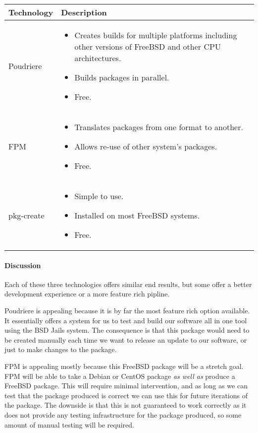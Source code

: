 \begin{center}
  \begin{tabular}{ | l | p{10cm} |}
    \hline
    Technology & Description  \\ \hline
    Poudriere \cite{poudriere-tutorial} &
    \begin{itemize}
      \item Creates builds for multiple platforms including other versions of FreeBSD and other CPU architectures.
      \item Builds packages in parallel.
      \item Free.
    \end{itemize}\\ \hline
    FPM \cite{fpm-home} &
    \begin{itemize}
      \item Translates packages from one format to another.
      \item Allows re-use of other system's packages.
      \item Free.
    \end{itemize}\\ \hline
    pkg-create \cite{pkg-create-man} &
    \begin{itemize}
      \item Simple to use.
      \item Installed on most FreeBSD systems.
      \item Free.
    \end{itemize}\\ \hline
  \end{tabular}
\end{center}

\paragraph{Discussion}

Each of these three technologies offers similar end results, but some offer a better development experience or a more feature rich pipline.

Poudriere is appealing because it is by far the most feature rich option available.
It essentially offers a system for us to test and build our software all in one tool using the BSD Jails system.
The consequence is that this package would need to be created manually each time we want to release an update to our software, or just to make changes to the package.

FPM is appealing mostly because this FreeBSD package will be a stretch goal.
FPM will be able to take a Debian or CentOS package \textit{as well as} produce a FreeBSD package.
This will require minimal intervention, and as long as we can test that the package produced is correct we can use this for future iterations of the package.
The downside is that this is not guaranteed to work correctly as it does not provide any testing infrastructure for the package produced, so some amount of manual testing will be required.

